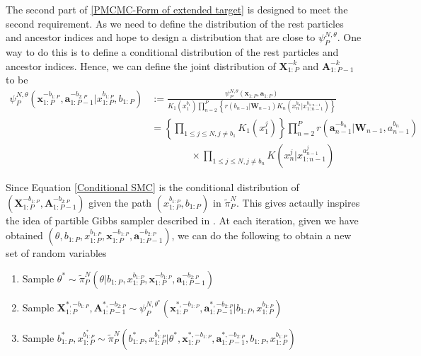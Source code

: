 \documentclass[12pt,a4paper]{article}
\begin{document}
The second part of \eqref{PMCMC-Form of extended target} is designed to meet the second requirement. As we need to define the distribution of the rest particles and ancestor indices and hope to design a distribution that are close to $\psi_P^{N,\theta}$. One way to do this is to define a conditional distribution of the rest particles and ancestor indices. Hence, we can define the joint distribution of $\textbf{X}_{1:P}^{-k}$ and $\textbf{A}_{1:P-1}^{-k}$ to be
\begin{equation}
    \label{Conditional SMC} 
    \begin{split}
        \psi_P^{N,\theta}\left(\mathbf{x}_{1:P}^{-b_{1:P}},\mathbf{a}_{1:P-1}^{-b_{2:P}}|x_{1:P}^{b_{1:P}},b_{1:P}\right) &:= \frac{\psi_P^{N,\theta}(\mathbf{x}_{1:P},\mathbf{a}_{1:P})}{K_1\left(x_1^{b_1}\right)\prod_{n=2}^P \left\{r\left(b_{n-1}|\mathbf{W}_{n-1}\right)K_n\left(x_n^{b_n}|x_{1:n-1}^{b_{1:n-1}}\right)\right\}}\\
        &= \left\{\prod_{1\leq j \leq N,j \neq b_1} K_1\left(x_1^j\right)\right\}\prod_{n=2}^P r\left(\mathbf{a}_{n-1}^{-b_{n}}|\mathbf{W}_{n-1},a_{n-1}^{b_n}\right) \\
        &\quad\quad\quad\quad \times \prod_{1 \leq j \leq N, j \neq b_n} K\left(x_n^j|x_{1:n-1}^{a_{n-1}^j}\right)
    \end{split}
\end{equation} 


Since Equation \eqref{Conditional SMC} is the conditional distribution of \(\left(\textbf{X}_{1:P}^{-b_{1:P}},\textbf{A}_{1:P-1}^{-b_{2:P}}\right)\) given the path \(\left(x_{1:P}^{b_{1:P}},b_{1:P}\right)\) in \(\tilde{\pi}_P^N\). This gives actaully inspires the idea of partible Gibbs sampler described in \cite{andrieu2010particle}. At each iteration, given we have obtained \(\left(\theta,b_{1:P},x_{1:P}^{b_{1:P}},\textbf{x}_{1:P}^{-b_{1:P}},\textbf{a}_{1:P-1}^{-b_{2:P}}\right)\), we can do the following to obtain a new set of random variables

\begin{enumerate}[label=\textit{Step \arabic*.},leftmargin=*]
    \item Sample $\theta^{*} \sim \tilde{\pi}_P^N\left(\theta|b_{1:P},x_{1:P}^{b_{1:P}},\textbf{x}_{1:P}^{-b_{1:P}},\textbf{a}_{1:P-1}^{-b_{2:P}}\right)$ 
    \item Sample $\textbf{X}_{1:P}^{*,-b_{1:P}},\textbf{A}_{1:P-1}^{*,-b_{2:P}} \sim \psi_P^{N,\theta^{*}}\left(\textbf{x}_{1:P}^{*,-b_{1:P}},\textbf{a}_{1:P-1}^{*,-b_{2:P}}|b_{1:P},x_{1:P}^{b_{1:P}}\right)$
    \item Sample $b_{1:P}^{*},x_{1:P}^{b_{1:P}^{*}} \sim \tilde{\pi}_P^N\left(b_{1:P}^{*},x_{1:P}^{b_{1:P}^{*}}|\theta^{*},\textbf{x}_{1:P}^{*,-b_{1:P}},\textbf{a}_{1:P-1}^{*,-b_{2:P}},b_{1:P},x_{1:P}^{b_{1:P}}\right)$
\end{enumerate}
\end{document}
